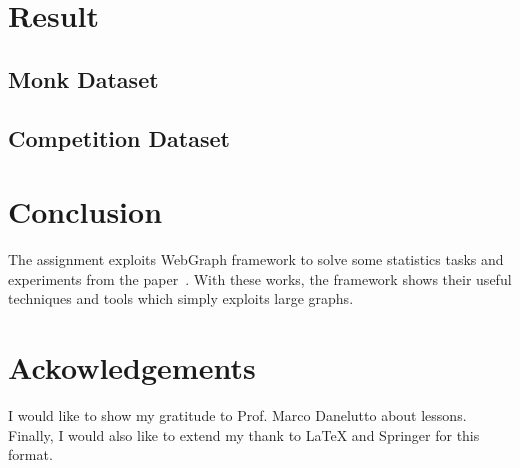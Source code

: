\documentclass[runningheads,a4paper]{llncs}
\begin{document}


\section{Result}
\label{Result}
\subsection{Monk Dataset}
\subsection{Competition Dataset}



\section{Conclusion}
\label{Conc}
The assignment exploits WebGraph framework to solve some statistics tasks and experiments from the paper~\cite{broder2000graph}. With these works, the framework shows their useful techniques and tools which simply exploits large graphs.

\section{Ackowledgements}
I would like to show my gratitude to Prof. Marco Danelutto about lessons.
Finally, I would also like to extend my thank to \LaTeX $ $ and Springer for this format.



\end{document}
